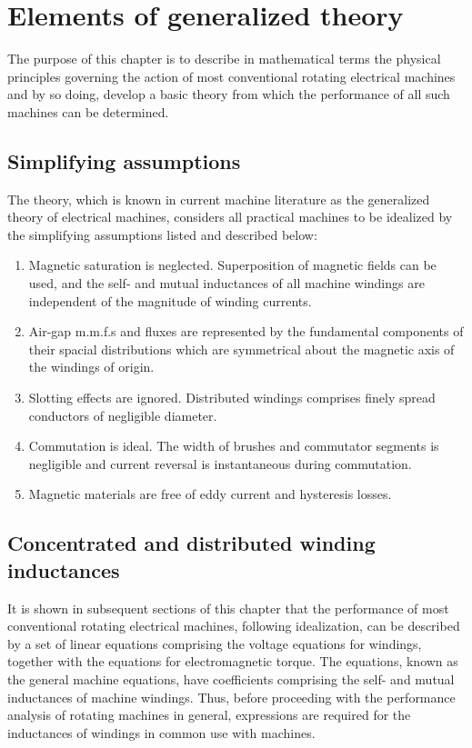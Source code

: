 \documentclass[a4paper,numbers=noenddot,12pt]{scrbook}
\begin{document}
\chapter{Elements of generalized theory}
The purpose of this chapter is to describe in mathematical terms the physical principles governing the action of most conventional rotating electrical machines and by so doing, develop a basic theory from which the performance of all such machines can be determined. 
\section{Simplifying assumptions}
The theory, which is known in current machine literature as the generalized theory of electrical machines, considers all practical machines to be idealized by the simplifying assumptions listed and described below:
\begin{enumerate}[label={(\alph*)}]
    \item Magnetic saturation is neglected. Superposition of magnetic fields can be  used, and the self- and mutual inductances of all machine windings are independent of the magnitude of winding currents.
    \item Air-gap m.m.f.s and fluxes are represented by the fundamental components of their spacial distributions which are symmetrical about the magnetic axis of the windings of origin.
    \item Slotting effects are ignored. Distributed windings comprises finely spread conductors of negligible diameter.
    \item Commutation is ideal. The width of brushes and commutator segments is negligible and current reversal is instantaneous during commutation.
    \item Magnetic materials are free of eddy current and hysteresis losses.
\end{enumerate}
\section{Concentrated and distributed winding inductances}
It is shown in subsequent sections of this chapter that the performance of most conventional rotating electrical machines, following idealization, can be described by a set of linear equations comprising the voltage equations for windings, together with the equations for electromagnetic torque. The equations, known as the general machine equations, have coefficients comprising the self- and mutual inductances of machine windings. Thus, before proceeding with the performance analysis of rotating machines in general, expressions are required for the inductances of windings in common use with machines.
\end{document}
